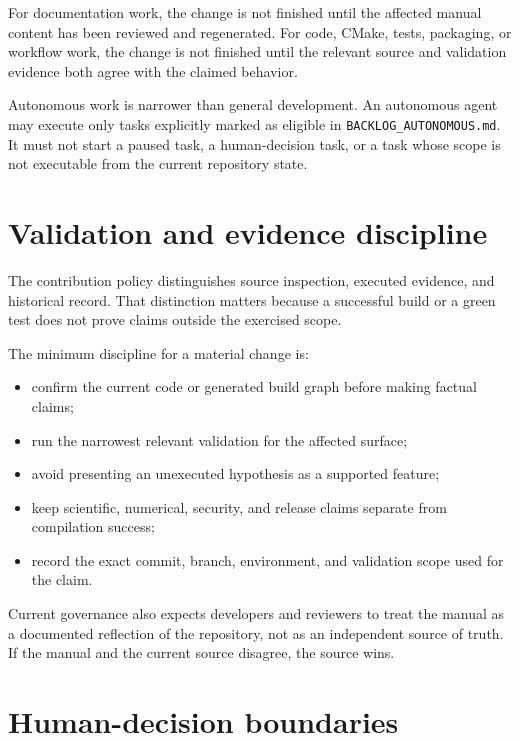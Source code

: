 For documentation work, the change is not finished until the affected manual
content has been reviewed and regenerated. For code, CMake, tests, packaging,
or workflow work, the change is not finished until the relevant source and
validation evidence both agree with the claimed behavior.

Autonomous work is narrower than general development. An autonomous agent may
execute only tasks explicitly marked as eligible in
\texttt{BACKLOG\_AUTONOMOUS.md}. It must not start a paused task, a
human-decision task, or a task whose scope is not executable from the current
repository state.

\section{Validation and evidence discipline}
\label{sec:governance-validation-evidence}

The contribution policy distinguishes source inspection, executed evidence, and
historical record. That distinction matters because a successful build or a
green test does not prove claims outside the exercised scope.

The minimum discipline for a material change is:
\begin{itemize}
\item confirm the current code or generated build graph before making factual
  claims;
\item run the narrowest relevant validation for the affected surface;
\item avoid presenting an unexecuted hypothesis as a supported feature;
\item keep scientific, numerical, security, and release claims separate from
  compilation success;
\item record the exact commit, branch, environment, and validation scope used
  for the claim.
\end{itemize}

Current governance also expects developers and reviewers to treat the manual as
a documented reflection of the repository, not as an independent source of
truth. If the manual and the current source disagree, the source wins.

\section{Human-decision boundaries}
\label{sec:governance-human-boundaries}

